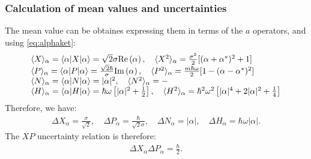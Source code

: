\subsubsection{Calculation of mean values and uncertainties}
The mean value can be obtaines expressing them in terms of the $a$ operators, and using \eqref{eq:alphaket}:
\begin{align}
    \begin{array}{l}
    \langle X\rangle_\alpha=\langle\alpha|X|\alpha\rangle=\sqrt{2}\sigma\text{Re}\left(\alpha\right),\quad\langle X^2\rangle_\alpha=\frac{\sigma^2}{2}[(\alpha+\alpha^*)^2+1]\\
    \langle P\rangle_\alpha=\langle\alpha|P|\alpha\rangle=\frac{\sqrt{2}\hbar}{\sigma}\text{Im}\left(\alpha\right),\quad\langle P^2\rangle_\alpha=\frac{m\hbar\omega}{2}[1-(\alpha-\alpha^*)^2]\\
    \langle N\rangle_\alpha=\langle\alpha|N|\alpha\rangle=|\alpha|^2,\quad\langle N^2\rangle_\alpha=-\\
    \langle H\rangle_\alpha=\langle\alpha|H|\alpha\rangle=\hbar\omega\left[|\alpha|^2+\frac{1}{2}\right],\quad\langle H^2\rangle_\alpha=\hbar^2\omega^2\left[|\alpha|^4+2|\alpha|^2+\frac{1}{4}\right]
    \end{array}
    \label{eq:meanvalues}
\end{align}
Therefore, we have:
\begin{align}
    \Delta X_\alpha=\frac{\sigma}{\sqrt{2}},\quad\Delta P_\alpha=\frac{\hbar}{\sqrt{2}\sigma},\quad\Delta N_\alpha=|\alpha|,\quad\Delta H_\alpha=\hbar\omega|\alpha|.
\end{align}
The $XP$ uncertainty relation is therefore:
\begin{align}
    \Delta X_\alpha\Delta P_\alpha=\frac{\hbar}{2}.
\end{align}
%
